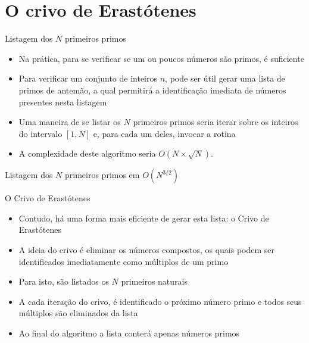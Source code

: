 \section{O crivo de Erastótenes}

\begin{frame}[fragile]{Listagem dos $N$ primeiros primos}

    \begin{itemize}
        \item Na prática, para se verificar se um ou poucos números são primos,
             é suficiente

        \item Para verificar um conjunto de inteiros $n$, pode ser útil gerar uma lista de primos de
            antemão, a qual permitirá a identificação imediata de números presentes nesta listagem

        \item Uma maneira de se listar os $N$ primeiros primos seria iterar sobre os inteiros do
            intervalo $[1, N]$ e, para cada um deles, invocar a rotina 

        \item A complexidade deste algoritmo seria $O(N\times \sqrt{N})$.
    \end{itemize}

\end{frame}

\begin{frame}[fragile]{Listagem dos $N$ primeiros primos em $O(N^{3/2})$}
\end{frame}

\begin{frame}[fragile]{O Crivo de Erastótenes}

    \begin{itemize}
        \item Contudo, há uma forma mais eficiente de gerar esta lista: o Crivo de Erastótenes

        \item A ideia do crivo é eliminar os números compostos, os quais podem ser identificados 
            imediatamente como múltiplos de um primo

        \item Para isto, são listados os $N$ primeiros naturais

        \item A cada iteração do crivo, é identificado o próximo número primo e todos seus 
            múltiplos são eliminados da lista

        \item Ao final do algoritmo a lista conterá apenas números primos
    \end{itemize}

\end{frame}

